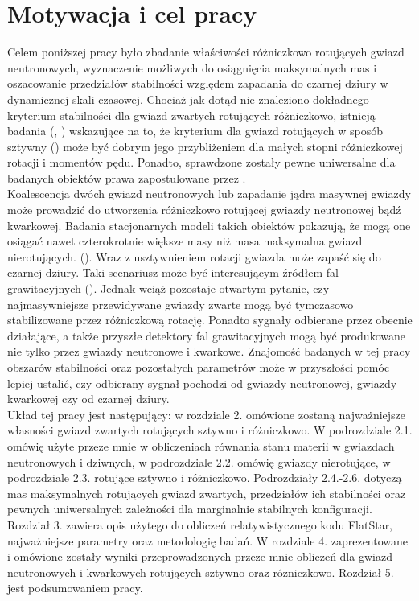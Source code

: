 \documentclass{bachelor_thesis}
\begin{document}
        \section{Motywacja i cel pracy}
        Celem poniższej pracy było zbadanie właściwości różniczkowo rotujących gwiazd neutronowych, wyznaczenie możliwych do osiągnięcia maksymalnych mas i oszacowanie przedziałów stabilności względem zapadania do czarnej dziury w dynamicznej skali czasowej. Chociaż jak dotąd nie znaleziono dokładnego kryterium stabilności dla gwiazd zwartych rotujących różniczkowo, istnieją badania (\citealp{Weih2018}, \citealp{Bozzola2018}) wskazujące na to, że kryterium dla gwiazd rotujących w sposób sztywny (\citealp{Friedman1988}) może być dobrym jego przybliżeniem dla małych stopni różniczkowej rotacji i momentów pędu. Ponadto, sprawdzone zostały pewne uniwersalne dla badanych obiektów prawa zapostulowane przez \cite{Bozzola2018}.\\
        \indent Koalescencja dwóch gwiazd neutronowych lub zapadanie jądra masywnej gwiazdy może prowadzić do utworzenia różniczkowo rotującej gwiazdy neutronowej bądź kwarkowej. Badania stacjonarnych modeli takich obiektów pokazują, że mogą one osiągać nawet czterokrotnie większe masy niż masa maksymalna gwiazd nierotujących. (\citealp{Rosinska2017}). Wraz z usztywnieniem rotacji gwiazda może zapaść się do czarnej dziury. Taki scenariusz może być interesującym źródłem fal grawitacyjnych (\citealp{Giacomazzo2011}). Jednak wciąż pozostaje otwartym pytanie, czy najmasywniejsze przewidywane gwiazdy zwarte mogą być tymczasowo stabilizowane przez różniczkową rotację. Ponadto sygnały odbierane przez obecnie działające, a także przyszłe detektory fal grawitacyjnych mogą być produkowane nie tylko przez gwiazdy neutronowe i kwarkowe. Znajomość badanych w tej pracy obszarów stabilności oraz pozostałych parametrów może w przyszłości pomóc lepiej ustalić, czy odbierany sygnał pochodzi od gwiazdy neutronowej, gwiazdy kwarkowej czy od czarnej dziury.\\
        \indent Układ tej pracy jest następujący: w rozdziale 2. omówione zostaną najważniejsze własności gwiazd zwartych rotujących sztywno i różniczkowo. W podrozdziale 2.1. omówię użyte przeze mnie w obliczeniach równania stanu materii w gwiazdach neutronowych i dziwnych, w podrozdziale 2.2. omówię gwiazdy nierotujące, w podrozdziale 2.3. rotujące sztywno i różniczkowo. Podrozdziały 2.4.-2.6. dotyczą mas maksymalnych rotujących gwiazd zwartych, przedziałów ich stabilności oraz pewnych uniwersalnych zależności dla marginalnie stabilnych konfiguracji. Rozdział 3. zawiera opis użytego do obliczeń relatywistycznego kodu FlatStar, najważniejsze parametry oraz metodologię badań. W rozdziale 4. zaprezentowane i omówione zostały wyniki przeprowadzonych przeze mnie obliczeń dla gwiazd neutronowych i kwarkowych rotujących sztywno oraz rózniczkowo. Rozdział 5. jest podsumowaniem pracy.
\end{document}
